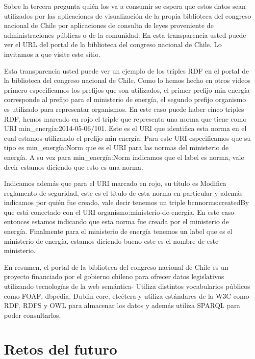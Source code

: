 Sobre la tercera pregunta quién los va a consumir se espera que estos datos sean utilizados por las aplicaciones de visualización de la propia biblioteca del congreso nacional de Chile por aplicaciones de consulta de leyes proveniente de administraciones públicas o de la comunidad. En esta transparencia usted puede ver el URL del portal de la biblioteca del congreso nacional de Chile. Lo invitamos a que visite este sitio.

Esta transparencia usted puede ver un ejemplo de los triples RDF en el portal de la biblioteca del congreso nacional de Chile. Como lo hemos hecho en otros videos primero especificamos los prefijos que son utilizados, el primer prefijo min energía corresponde al prefijo para el ministerio de energía, el segundo prefijo organismo es utilizado para representar organismos. En este caso puede haber cinco triples RDF, hemos marcado en rojo el triple que representa una norma que tiene como URI min_energía:2014-05-06/101. Este es el URI que identifica esta norma en el cual estamos utilizando el prefijo min energía. Para este URI especificamos que su tipo es min_energía:Norm que es el URI para las normas del ministerio de energía. A su vez para min_energía:Norm indicamos que el label es norma, vale decir estamos diciendo que esto es una norma.

Indicamos además que para el URI marcado en rojo, su título es Modifica reglamento de seguridad, este es el título de esta norma en particular y además indicamos por quién fue creado, vale decir tenemos un triple bcnnorms:createdBy que está conectado con el URI organismo:ministerio-de-energía. En este caso entonces estamos indicando que esta norma fue creada por el ministerio de energía. Finalmente para el ministerio de energía tenemos un label que es el ministerio de energía, estamos diciendo bueno este es el nombre de este ministerio.

En resumen, el portal de la biblioteca del congreso nacional de Chile es un proyecto financiado por el gobierno chileno para ofrecer datos legislativos utilizando tecnologías de la web semántica- Utiliza distintos vocabularios públicos como FOAF, dbpedia, Dublin core, etcétera y utiliza estándares de la W3C como RDF, RDFS y OWL para almacenar los datos y además utiliza SPARQL para poder consultarlos. 


\section{Retos del futuro}

